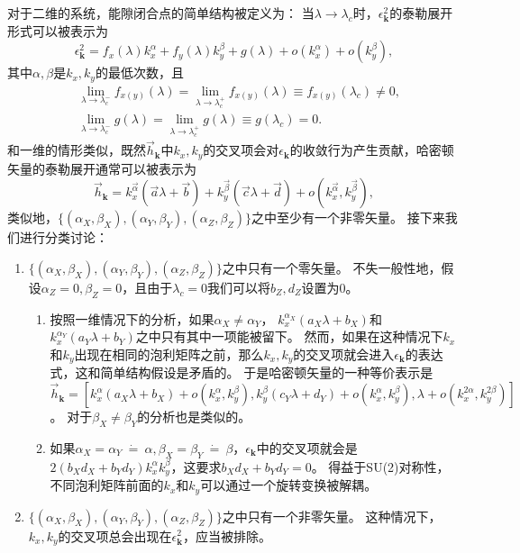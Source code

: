 			对于二维的系统，能隙闭合点的简单结构被定义为：
			当$\lambda \rightarrow \lambda_c$时，$\epsilon_\mathbf{k}^2$的泰勒展开形式可以被表示为
			\begin{equation}
				\epsilon_\mathbf{k}^2 = f_x(\lambda) k_x^\alpha + f_y(\lambda) k_y^\beta + g(\lambda) + o(k_x^\alpha) + o(k_y^\beta),
			\end{equation}
			其中$\alpha,\beta$是$k_x,k_y$的最低次数，且
			\begin{equation}
				\begin{aligned}
					& \lim_{\lambda \rightarrow \lambda_c^-}{f_{x(y)}(\lambda)} = \lim_{\lambda \rightarrow \lambda_c^+}{f_{x(y)}(\lambda)} \equiv f_{x(y)}(\lambda_c)\neq0,\\
					& \lim_{\lambda \rightarrow \lambda_c^-}{g(\lambda)} = \lim_{\lambda \rightarrow \lambda_c^+}{g(\lambda)} \equiv g(\lambda_c)=0.
				\end{aligned}
			\end{equation}
			和一维的情形类似，既然$\vec{h}_\mathbf{k}$中$k_x,k_y$的交叉项会对$\epsilon_\mathbf{k}$的收敛行为产生贡献，哈密顿矢量的泰勒展开通常可以被表示为
			\begin{equation}
				\vec{h}_\mathbf{k} = k_x^{\vec{\alpha}}(\vec{a} \lambda + \vec{b}) + k_y^{\vec{\beta}}(\vec{c} \lambda + \vec{d}) + o(k_x^{\vec{\alpha}} ,k_y^{\vec{\beta}}),
			\end{equation}
			类似地，$\{(\alpha_X,\beta_X),(\alpha_Y,\beta_Y),(\alpha_Z,\beta_Z)\}$之中至少有一个非零矢量。
			接下来我们进行分类讨论：
			\begin{enumerate}
				\item $\{(\alpha_X,\beta_X),(\alpha_Y,\beta_Y),(\alpha_Z,\beta_Z)\}$之中只有一个零矢量。
				不失一般性地，假设$\alpha_Z=0,\beta_Z=0$，且由于$\lambda_c = 0$我们可以将$b_Z,d_Z$设置为0。
				\begin{enumerate}
					\item 按照一维情况下的分析，如果$\alpha_X \neq \alpha_Y$，
					$k_x^{\alpha_X}(a_X \lambda + b_X)$和$k_x^{\alpha_Y}(a_Y \lambda + b_Y)$之中只有其中一项能被留下。
					然而，如果在这种情况下$k_x$和$k_y$出现在相同的泡利矩阵之前，那么$k_x,k_y$的交叉项就会进入$\epsilon_\mathbf{k}$的表达式，这和简单结构假设是矛盾的。
					于是哈密顿矢量的一种等价表示是$\vec{h}_\mathbf{k} = [k_x^{\alpha}(a_X \lambda + b_X) + o(k_x^{\alpha}, k_y^{\beta}),  k_y^{\beta}(c_Y \lambda + d_Y) + o(k_x^{\alpha}, k_y^{\beta}), \lambda + o(k_x^{2\alpha}, k_y^{2\beta})]$。
					对于$\beta_X \neq \beta_Y$的分析也是类似的。
					\item 如果$\alpha_X = \alpha_Y \ \dot= \ \alpha, \beta_X = \beta_Y
					\ \dot= \ \beta$，$\epsilon_\mathbf{k}$中的交叉项就会是$2(b_X d_X + b_Y d_Y)k_x^\alpha    k_y^{\beta}$，这要求$b_X d_X + b_Y d_Y = 0$。
					得益于SU(2)对称性，不同泡利矩阵前面的$k_x$和$k_y$可以通过一个旋转变换被解耦。
				\end{enumerate}
				\item $\{(\alpha_X,\beta_X),(\alpha_Y,\beta_Y),(\alpha_Z,\beta_Z)\}$之中只有一个非零矢量。
				这种情况下，$k_x,k_y$的交叉项总会出现在$\epsilon_\mathbf{k}^2$，应当被排除。
			\end{enumerate}
